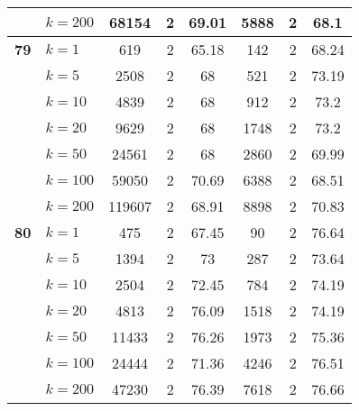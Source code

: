 \begin{table}[htbp]
\begin{tabular}{|l|l|c|c|c|c|c|c|}
     & $k=200$ & 68154 & 2 & 69.01 & 5888 & 2 & 68.1 \\ \hline
    \multicolumn{1}{|r|}{\textbf{79}} & $k=1$ & 619 & 2 & 65.18 & 142 & 2 & 68.24 \\ 
     & $k=5$ & 2508 & 2 & 68 & 521 & 2 & 73.19 \\ 
     & $k=10$ & 4839 & 2 & 68 & 912 & 2 & 73.2 \\ 
     & $k=20$ & 9629 & 2 & 68 & 1748 & 2 & 73.2 \\ 
     & $k=50$ & 24561 & 2 & 68 & 2860 & 2 & 69.99 \\ 
     & $k=100$ & 59050 & 2 & 70.69 & 6388 & 2 & 68.51 \\ 
     & $k=200$ & 119607 & 2 & 68.91 & 8898 & 2 & 70.83 \\ \hline
    \multicolumn{1}{|r|}{\textbf{80}} & $k=1$ & 475 & 2 & 67.45 & 90 & 2 & 76.64 \\ 
     & $k=5$ & 1394 & 2 & 73 & 287 & 2 & 73.64 \\ 
     & $k=10$ & 2504 & 2 & 72.45 & 784 & 2 & 74.19 \\ 
     & $k=20$ & 4813 & 2 & 76.09 & 1518 & 2 & 74.19 \\ 
     & $k=50$ & 11433 & 2 & 76.26 & 1973 & 2 & 75.36 \\ 
     & $k=100$ & 24444 & 2 & 71.36 & 4246 & 2 & 76.51 \\ 
     & $k=200$ & 47230 & 2 & 76.39 & 7618 & 2 & 76.66 \\ \hline
    \end{tabular}
\end{table}
